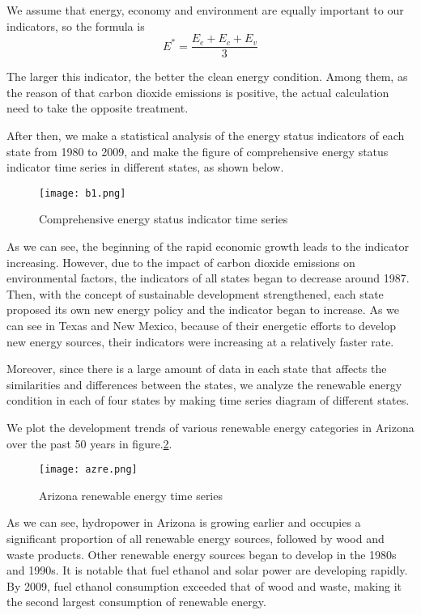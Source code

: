 \documentclass{mcmthesis}
\begin{document}
We assume that energy, economy and environment are equally important to our indicators, so the formula is
\begin{equation}
  E^{*} = \frac{E_e + E_c + E_v}{3}
\end{equation}

The larger this indicator, the better the clean energy condition. Among them, as the reason of that carbon dioxide emissions is positive, the actual calculation need to take the opposite treatment.

After then, we make a statistical analysis of the energy status indicators of each state from 1980 to 2009, and make the figure of comprehensive energy status indicator time series in different states, as shown below.
\begin{figure}[htb]
  \centering
  \texttt{[image: b1.png]}
  \caption{Comprehensive energy status indicator time series} \label{fig: Comprehensive energy status indicator time series}
\end{figure}

As we can see, the beginning of the rapid economic growth leads to the indicator increasing. However, due to the impact of carbon dioxide emissions on  environmental factors, the indicators of all states began to decrease around 1987. Then, with the concept of sustainable development strengthened, each state proposed its own new energy policy and the indicator began to increase. As we can see in Texas and New Mexico, because of their energetic efforts to develop new energy sources, their indicators were increasing at a relatively faster rate.

Moreover, since there is a large amount of data in each state that affects the similarities and differences between the states, we analyze the renewable energy condition in each of four states by making time series diagram of different states.

We plot the development trends of various renewable energy categories in Arizona over the past 50 years in figure.\ref{fig: Arizona renewable energy time series}.
\begin{figure}[htb]
  \centering
  \texttt{[image: azre.png]}
  \caption{Arizona renewable energy time series} \label{fig: Arizona renewable energy time series}
\end{figure}

As we can see, hydropower in Arizona is growing earlier and occupies a significant proportion of all renewable energy sources, followed by wood and waste products. Other renewable energy sources began to develop in the 1980s and 1990s. It is notable that fuel ethanol and solar power are developing rapidly. By 2009, fuel ethanol consumption exceeded that of wood and waste, making it the second largest consumption of renewable energy.
\end{document}
